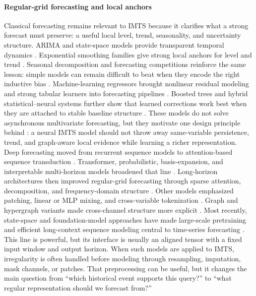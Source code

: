 \documentclass[preprint,12pt]{elsarticle}
\begin{document}
\paragraph{Regular-grid forecasting and local anchors}
Classical forecasting remains relevant to IMTS because it clarifies what a
strong forecast must preserve: a useful local level, trend, seasonality, and
uncertainty structure. ARIMA and state-space models provide transparent
temporal dynamics \citep{BoxJenkins1970,Harvey1989,Hamilton1994,DurbinKoopman2012}.
Exponential smoothing families give strong local anchors for level and trend
\citep{Holt1957,Winters1960,Gardner1985,Hyndman2002,Hyndman2008}. Seasonal
decomposition and forecasting competitions reinforce the same lesson: simple
models can remain difficult to beat when they encode the right inductive bias
\citep{Cleveland1990STL,Assimakopoulos2000Theta,Makridakis2018M4,Makridakis2022M5}.
Machine-learning regressors brought nonlinear residual modeling and strong
tabular learners into forecasting pipelines \citep{Drucker1997SVR,Smola2004SVR,Breiman2001RandomForest,Friedman2001GBM}.
Boosted trees and hybrid statistical--neural systems further show that learned
corrections work best when they are attached to stable baseline structure
\citep{Chen2016XGBoost,Ke2017LightGBM,Zhang2003HybridARIMAANN,KhasheiBijari2011Hybrid,MonteroManso2020FFORMA,Smyl2020ESRNN}.
These models do not solve asynchronous multivariate forecasting, but they
motivate one design principle behind \method{}: a neural IMTS model should not
throw away same-variable persistence, trend, and graph-aware local evidence
while learning a richer representation. Deep forecasting moved from recurrent sequence models to attention-based
sequence transduction \citep{Hochreiter1997LSTM,Cho2014GRU,Sutskever2014Seq2Seq,Bahdanau2015Attention}.
Transformer, probabilistic, basis-expansion, and interpretable multi-horizon
models broadened that line \citep{Vaswani2017Transformer,Salinas2020DeepAR,Oreshkin2020NBEATS,Lim2021TFT}.
Long-horizon architectures then improved regular-grid forecasting through
sparse attention, decomposition, and frequency-domain structure
\citep{informer,Wu2021Autoformer,Zhou2022FEDformer,Wu2023TimesNet}. Other
models emphasized patching, linear or MLP mixing, and cross-variable
tokenization \citep{Nie2023PatchTST,Zeng2023LTSFLinear,Das2023TiDE,Ekambaram2023TSMixer}.
Graph and hypergraph variants made cross-channel structure more explicit
\citep{Crossformer2023,FourierGNN2023,AdaMSHyper2024,iTransformer2024,TimeMixer2024}.
Most recently, state-space and foundation-model approaches have made
large-scale pretraining and efficient long-context sequence modeling central to
time-series forecasting \citep{Mamba2024,MambaTS2024,Moirai2024,TimesFM2024,Chronos2024,LagLlama2023}.
This line is powerful, but its interface is usually an aligned tensor with a
fixed input window and output horizon. When such models are applied to IMTS,
irregularity is often handled before modeling through resampling, imputation,
mask channels, or patches. That preprocessing can be useful, but it changes the
main question from ``which historical event supports this query?'' to ``what
regular representation should we forecast from?''
\end{document}
